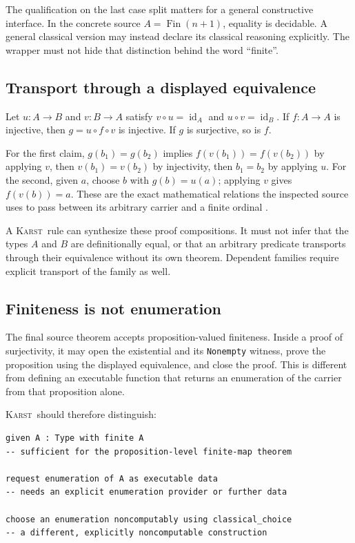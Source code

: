 \documentclass[11pt,letterpaper]{article}
\newcommand{\code}[1]{\nolinkurl{#1}}
\newcommand{\Karst}{\textsc{Karst}}
\theoremstyle{remark}
\begin{document}
The qualification on the last case split matters for a general constructive
interface. In the concrete source $A=\operatorname{Fin}(n+1)$, equality is
decidable. A general classical version may instead declare its classical
reasoning explicitly. The wrapper must not hide that distinction behind the
word ``finite''.

\subsection{Transport through a displayed equivalence}
Let $u:A\to B$ and $v:B\to A$ satisfy $v\circ u=\operatorname{id}_A$ and
$u\circ v=\operatorname{id}_B$. If $f:A\to A$ is injective, then
$g=u\circ f\circ v$ is injective. If $g$ is surjective, so is $f$.

For the first claim, $g(b_1)=g(b_2)$ implies
$f(v(b_1))=f(v(b_2))$ by applying $v$, then $v(b_1)=v(b_2)$ by injectivity,
then $b_1=b_2$ by applying $u$. For the second, given $a$, choose $b$ with
$g(b)=u(a)$; applying $v$ gives $f(v(b))=a$.
These are the exact mathematical relations the inspected source uses to pass
between its arbitrary carrier and a finite ordinal \cite{finite}.

A \Karst\ rule can synthesize these proof compositions. It must not infer
that the types $A$ and $B$ are definitionally equal, or that an arbitrary
predicate transports through their equivalence without its own theorem.
Dependent families require explicit transport of the family as well.

\subsection{Finiteness is not enumeration}\label{sec:finite-data}
The final source theorem accepts proposition-valued finiteness. Inside a proof
of surjectivity, it may open the existential and its \code{Nonempty} witness,
prove the proposition using the displayed equivalence, and close the proof.
This is different from defining an executable function that returns an
enumeration of the carrier from that proposition alone.

\Karst\ should therefore distinguish:
\begin{lstlisting}[caption={A proposition-valued property versus computational data.}]
given A : Type with finite A
-- sufficient for the proposition-level finite-map theorem

request enumeration of A as executable data
-- needs an explicit enumeration provider or further data

choose an enumeration noncomputably using classical_choice
-- a different, explicitly noncomputable construction
\end{lstlisting}
\end{document}

